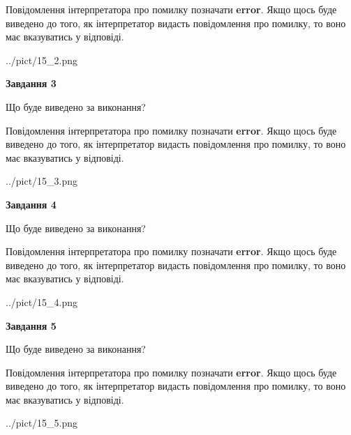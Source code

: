 \documentclass[12pt, ukrainian]{article}
\begin{document}
{\begin {large}
Повідомлення інтерпретатора про помилку позначати \textbf{error}.
Якщо щось буде виведено до того, як інтерпретатор видасть повідомлення про помилку, 
то воно має вказуватись у відповіді. \par


\begin{center}
	{../pict/15_2.png}
\end{center}
\newpage

{\begin {center}\textbf{Завдання 3}\end {center}}\par
Що буде виведено за виконання?

Повідомлення інтерпретатора про помилку позначати \textbf{error}.
Якщо щось буде виведено до того, як інтерпретатор видасть повідомлення про помилку, 
то воно має вказуватись у відповіді. \par


\begin{center}
	{../pict/15_3.png}
\end{center}
\newpage

{\begin {center}\textbf{Завдання 4}\end {center}}\par
Що буде виведено за виконання?

Повідомлення інтерпретатора про помилку позначати \textbf{error}.
Якщо щось буде виведено до того, як інтерпретатор видасть повідомлення про помилку, 
то воно має вказуватись у відповіді. \par


\begin{center}
	{../pict/15_4.png}
\end{center}
\newpage

{\begin {center}\textbf{Завдання 5}\end {center}}\par
Що буде виведено за виконання?

Повідомлення інтерпретатора про помилку позначати \textbf{error}.
Якщо щось буде виведено до того, як інтерпретатор видасть повідомлення про помилку, 
то воно має вказуватись у відповіді. \par


\begin{center}
	{../pict/15_5.png}
\end{center}
\newpage


\end{large}}
\end{document}
